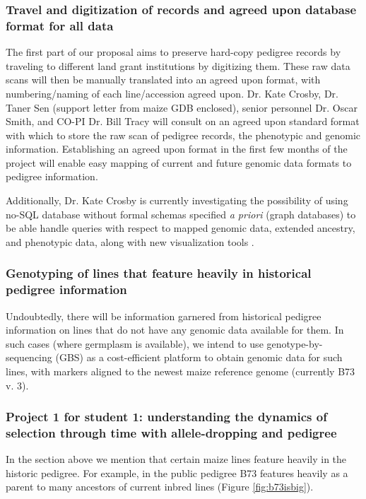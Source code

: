 \documentclass[12pt]{article}
\begin{document}
\subsubsection*{Travel and digitization of records and agreed upon database format for all data}
The first part of our proposal aims to preserve hard-copy pedigree records by traveling to different land grant institutions by digitizing them. These raw data scans will then be manually translated into an agreed upon format, with numbering/naming of each line/accession agreed upon.
Dr. Kate Crosby, Dr. Taner Sen (support letter from maize GDB enclosed), senior personnel Dr. Oscar Smith, and CO-PI Dr. Bill Tracy will consult on an agreed upon standard format with which to store the raw scan of pedigree records, the phenotypic and genomic information. Establishing an agreed upon format in the first few months of the project will enable easy mapping of current and future genomic data formats to pedigree information.
\par Additionally, Dr. Kate Crosby is currently investigating the possibility of using no-SQL database without formal schemas specified \textit{a priori} (graph databases) to be able handle queries with respect to mapped genomic data, extended ancestry, and phenotypic data, along with new visualization tools \citep{ParejaTobes:2015bf}.



\subsubsection*{Genotyping of lines that feature heavily in historical pedigree information}
Undoubtedly, there will be information garnered from historical pedigree information on lines that do not have any genomic data available for them. In such cases (where germplasm is available), we intend to use genotype-by-sequencing (GBS) \citep{Elshire:2011ha} as a cost-efficient platform \citep{Glaubitz:2014eu} to obtain genomic data for such lines, with markers aligned to the newest maize reference genome (currently B73 v. 3). 

\subsubsection*{Project 1 for student 1: understanding the dynamics of selection through time with allele-dropping and pedigree}
In the section above we mention that certain maize lines feature heavily in the historic pedigree. For example, in the public pedigree B73 features heavily as a parent to many ancestors of current inbred lines (Figure \ref{fig:b73isbig}). 
\end{document}
